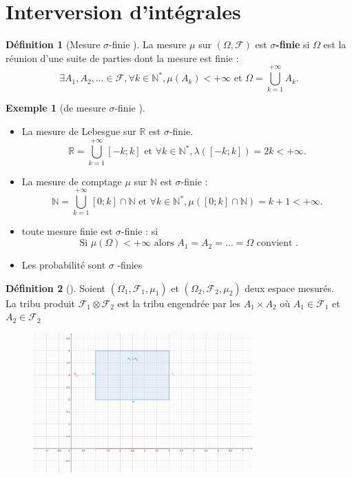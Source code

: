 \documentclass{article}
\theoremstyle{plain}%
\theoremstyle{definition}
\newtheorem{defn}{Définition}[section]
\newtheorem{exmp}{Exemple}[section]
\theoremstyle{remark}
\begin{document}
    \section{Interversion d'intégrales}
    \begin{defn}[Mesure $ \sigma  $-finie ]
        La mesure $ \mu  $  sur $ (\Omega , \mathcal{F}) $ est \textbf{$ \sigma  $-finie } si $ \Omega  $ est la réunion d'une suite de parties dont la mesure est finie : 
        \[
            \exists A_1, A_2, \dots \in \mathcal{F}, \forall k \in \mathbb{N}^*, \mu (A_k) < + \infty \text{ et } \Omega = \bigcup_{k=1}^{+\infty }A_k
        .\]
    \end{defn}
    \begin{exmp}[de mesure $ \sigma  $-finie ]
        \begin{itemize}
            \item La mesure de Lebesgue sur $ \mathbb{R} $ est $ \sigma  $-finie. 
            \[
                \mathbb{R}= \bigcup_{k=1}^{+\infty} [-k;k]\text{ et } \forall k \in \mathbb{N}^*, \lambda ([-k;k]) = 2k < +\infty 
            .\]
            \item La mesure de comptage $ \mu  $ sur $ \mathbb{N} $ est $ \sigma  $-finie : 
            \[
                \mathbb{N} = \bigcup_{k=1}^{+ \infty } [0;k] \cap \mathbb{N} \text{ et } \forall k \in \mathbb{N}^*, \mu ([0;k] \cap \mathbb{N}) = k+1 < +\infty 
            .\]
            \item toute mesure finie est $ \sigma  $-finie : si
            \[
                \text{ Si } \mu (\Omega ) < + \infty \text{ alors } A_1 = A_2 = \dots = \Omega \text{ convient }
            .\]
            \item Les probabilité sont $ \sigma  $ -finies
        \end{itemize}
    \end{exmp}
    
    \begin{defn}[]
        Soient $ (\Omega _1, \mathcal{F}_1, \mu _1) $ et $ (\Omega _2, \mathcal{F}_2, \mu _2) $ deux espace mesurés. \\
        La tribu produit $ \mathcal{F}_1 \otimes \mathcal{F}_2 $ est la tribu engendrée par les $ A_1 \times A_2 $ où $ A_1 \in \mathcal{F}_1 $ et $ A_2 \in \mathcal{F}_2 $ 
    \end{defn}
    \begin{figure}[htbp]
        \centering
        \includegraphics*[width=0.75\textwidth]{figures_chap2/fig1.png}
    \end{figure}
    
\end{document}
